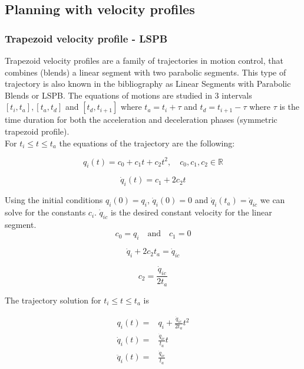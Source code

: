 \subsection{Planning with velocity profiles}

\subsubsection{Trapezoid velocity profile - LSPB}

Trapezoid velocity profiles are a family of trajectories in motion control, that combines (blends) a linear segment with two parabolic segments. This type of trajectory is also known in the bibliography as 
Linear Segments with Parabolic Blends or LSPB. The equations of motions are studied in 3 intervals $[t_i, t_a], [t_a, t_d]$ and $[t_d, t_{i+1}]$ where $t_a = t_i + τ$ and $t_d = t_{i+1} - τ$ where $τ$ is 
the time duration for both the acceleration and deceleration phases (symmetric trapezoid profile). \\

For $t_i \leq t \leq t_a$ the equations of the trajectory are the following:

\begin{equation}
q_i(t) = c_0 + c_1t + c_2t^2, \quad c_0,c_1,c_2 \in \mathbb{R}
\end{equation}

\begin{equation}
\dot{q}_i(t) = c_1 + 2c_2t
\end{equation}

Using the initial conditions $q_i(0) = q_i$, $\dot{q}_i(0) = 0$ and $\dot{q}_i(t_a) = \dot{q}_{ic}$ we can solve for the constants $c_i$. $\dot{q}_{ic}$ is the desired constant velocity for the linear segment.
\begin{equation}
c_0 = q_i \quad \textrm{and} \quad c_1 = 0
\end{equation}

\[
\dot{q}_i + 2c_2t_a = \dot{q}_{ic}
\]

\begin{equation}
c_2 = \frac{\dot{q}_{ic}}{2t_a}
\end{equation}

The trajectory solution for $t_i \leq t \leq t_a$ is

\begin{equation}
\begin{aligned}
q_i(t) ={}& q_i + \frac{\dot{q}_{ic}}{2t_a}t^2 \\
\dot{q}_i(t) ={}& \frac{\dot{q}_{ic}}{t_a}t \\
\ddot{q}_i(t) ={}& \frac{\dot{q}_{ic}}{t_a} \\
\end{aligned}
\end{equation}

